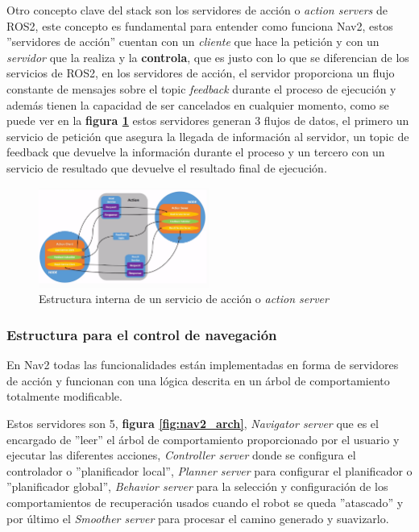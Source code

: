 Otro concepto clave del stack son los servidores de acción o \textit{action servers} de ROS2, este concepto es fundamental para entender como funciona 
Nav2, estos ''servidores de acción'' cuentan con un \textit{cliente} que hace la petición y con un \textit{servidor} que la realiza y la \textbf{controla}, que es 
justo con lo que se diferencian de los servicios de ROS2, en los servidores de acción, el servidor proporciona un flujo constante de mensajes sobre el topic \textit{feedback} 
durante el proceso de ejecución y además tienen la capacidad de ser cancelados en cualquier momento, como se puede ver en la \textbf{figura \ref{fig:servicios_accion}} estos servidores 
generan 3 flujos de datos, el primero un servicio de petición que asegura la llegada de información al servidor, un topic de feedback que devuelve la información durante el proceso y 
un tercero con un servicio de resultado que devuelve el resultado final de ejecución.

\begin{figure}[h]
    \centering
    \includegraphics[width=0.5\textwidth]{images/action_server.png}
    \caption{Estructura interna de un servicio de acción o \textit{action server} \cite{ros2}}
    \label{fig:servicios_accion}
\end{figure}

\subsubsection{Estructura para el control de navegación}

En Nav2 todas las funcionalidades están implementadas en forma de servidores de acción y funcionan con una lógica descrita en un árbol de 
comportamiento totalmente modificable.

Estos servidores son 5, \textbf{figura \ref{fig:nav2_arch}}, \textit{Navigator server} que es el encargado de ''leer'' el árbol de comportamiento proporcionado por el usuario y ejecutar las 
diferentes acciones, \textit{Controller server} donde se configura el controlador o ''planificador local'', \textit{Planner server} para configurar 
el planificador o ''planificador global'', \textit{Behavior server} para la selección y configuración de los comportamientos de recuperación 
usados cuando el robot se queda ''atascado'' y por último el \textit{Smoother server} para procesar el camino generado y suavizarlo.

